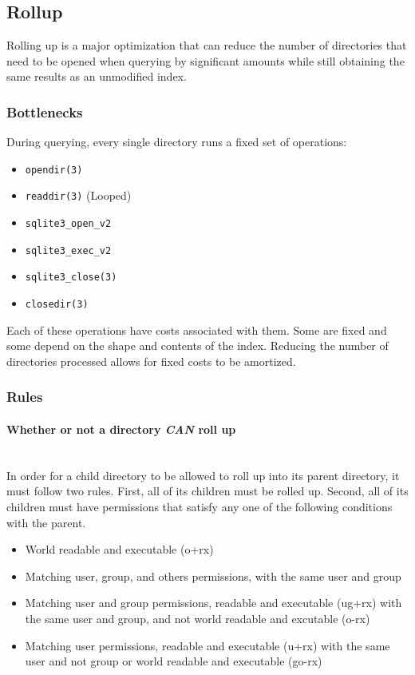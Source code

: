 \subsection{Rollup}
\label{sec:rollup}
Rolling up is a major optimization that can reduce the number of
directories that need to be opened when querying by significant
amounts while still obtaining the same results as an unmodified index.

\subsubsection{Bottlenecks}
During querying, every single directory runs a fixed set of
operations:

\begin{itemize}
  \item \texttt{opendir(3)}
  \item \texttt{readdir(3)} (Looped)
  \item \texttt{sqlite3\_open\_v2}
  \item \texttt{sqlite3\_exec\_v2}
  \item \texttt{sqlite3\_close(3)}
  \item \texttt{closedir(3)}
\end{itemize}

Each of these operations have costs associated with them. Some are
fixed and some depend on the shape and contents of the index. Reducing
the number of directories processed allows for fixed costs to be
amortized.

\subsubsection{Rules}
\label{sec:rolluprules}
\paragraph{Whether or not a directory {\it CAN} roll up} ~\\
In order for a child directory to be allowed to roll up into its
parent directory, it must follow two rules. First, all of its children
must be rolled up. Second, all of its children must have permissions
that satisfy any one of the following conditions with the parent.

\begin{itemize}
  \item World readable and executable (o+rx)
  \item Matching user, group, and others permissions, with the same
    user and group
  \item Matching user and group permissions, readable and executable
    (ug+rx) with the same user and group, and not world readable and
    excutable (o-rx)
  \item Matching user permissions, readable and executable (u+rx) with
    the same user and not group or world readable and executable
    (go-rx)
\end{itemize}

